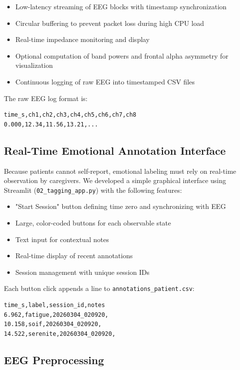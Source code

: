 \begin{itemize}
    \item Low-latency streaming of EEG blocks with timestamp synchronization
    \item Circular buffering to prevent packet loss during high CPU load
    \item Real-time impedance monitoring and display
    \item Optional computation of band powers and frontal alpha asymmetry for visualization
    \item Continuous logging of raw EEG into timestamped CSV files
\end{itemize}

The raw EEG log format is:
\begin{verbatim}
time_s,ch1,ch2,ch3,ch4,ch5,ch6,ch7,ch8
0.000,12.34,11.56,13.21,...
\end{verbatim}

\subsection{Real-Time Emotional Annotation Interface}

Because patients cannot self-report, emotional labeling must rely on real-time observation by caregivers. We developed a simple graphical interface using Streamlit (\texttt{02\_tagging\_app.py}) with the following features:

\begin{itemize}
    \item "Start Session" button defining time zero and synchronizing with EEG
    \item Large, color-coded buttons for each observable state
    \item Text input for contextual notes
    \item Real-time display of recent annotations
    \item Session management with unique session IDs
\end{itemize}

Each button click appends a line to \texttt{annotations\_patient.csv}:
\begin{verbatim}
time_s,label,session_id,notes
6.962,fatigue,20260304_020920,
10.158,soif,20260304_020920,
14.522,serenite,20260304_020920,
\end{verbatim}

\subsection{EEG Preprocessing}

